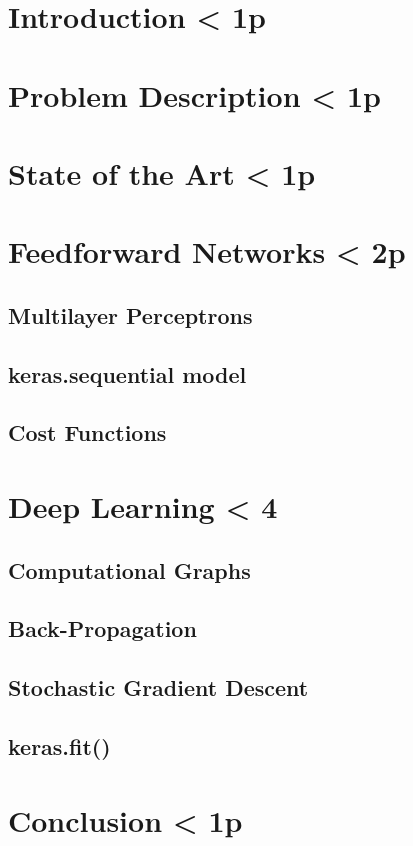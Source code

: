 \documentclass{article}
\begin{document}
    \section{Introduction < 1p}
    \section{Problem Description < 1p}
    \section{State of the Art < 1p}

    \section{Feedforward Networks < 2p}
    \subsection{Multilayer Perceptrons}
    \subsection{keras.sequential model}
    \subsection{Cost Functions}

    \section{Deep Learning < 4}
    \subsection{Computational Graphs}
    \subsection{Back-Propagation}
    \subsection{Stochastic Gradient Descent}
    \subsection{keras.fit()}

    \section{Conclusion < 1p}
\end{document}
